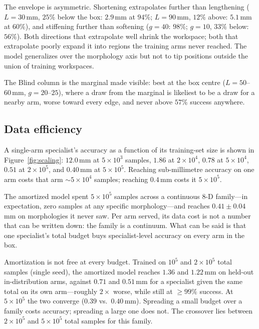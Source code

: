 \documentclass[robotics,article,submit,moreauthors]{Definitions/mdpi}
\begin{document}
The envelope is asymmetric. Shortening extrapolates further than
lengthening ($L{=}30\,$mm, $25\%$ below the box: $2.9\,$mm at $94\%$;
$L{=}90\,$mm, $12\%$ above: $5.1\,$mm at $60\%$), and stiffening further
than softening ($g{=}40$: $98\%$; $g{=}10$, $33\%$ below: $56\%$). Both
directions that extrapolate well shrink the workspace; both that
extrapolate poorly expand it into regions the training arms never reached.
The model generalizes over the morphology axis but not to tip positions
outside the union of training workspaces.

The Blind column is the marginal made visible: best at the box centre
($L{=}50$--$60\,$mm, $g{=}20$--$25$), where a draw from the marginal is
likeliest to be a draw for a nearby arm, worse toward every edge, and
never above $57\%$ success anywhere.

\subsection{Data efficiency}
\label{sec:data}

A single-arm specialist's accuracy as a function of its training-set size
is shown in Figure~\ref{fig:scaling}: $12.0\,$mm at $5\times10^3$
samples, $1.86$ at $2\times10^4$, $0.78$ at $5\times10^4$, $0.51$ at
$2\times10^5$, and $0.40\,$mm at $5\times10^5$. Reaching sub-millimetre
accuracy on one arm costs that arm $\sim$$5\times10^4$ samples; reaching
$0.4\,$mm costs it $5\times10^5$.

The amortized model spent $5\times10^5$ samples across a continuous 8-D
family---in expectation, zero samples at any specific morphology---and
reaches $0.41\pm0.04\,$mm on morphologies it never saw. Per arm served, its data
cost is not a number that can be written down: the family is a continuum.
What can be said is that one specialist's total budget buys specialist-level
accuracy on every arm in the box.

Amortization is not free at every budget. Trained on $10^5$ and
$2\times10^5$ total samples (single seed), the amortized model reaches
$1.36$ and $1.22\,$mm on held-out in-distribution arms, against $0.71$ and
$0.51\,$mm for a specialist given the same total on its own arm---roughly
$2\times$ worse, while still at $\geq 99\%$ success. At $5\times10^5$ the
two converge ($0.39$ vs.\ $0.40\,$mm). Spreading a small budget over a
family costs accuracy; spreading a large one does not. The crossover lies
between $2\times10^5$ and $5\times10^5$ total samples for this family.
\end{document}
